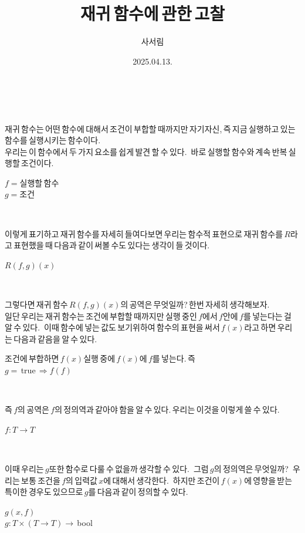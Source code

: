 \documentclass{article}
\title{재귀\,함수에\,관한\,고찰}
\author{사서림}
\date{2025.04.13.}
\begin{document}
\maketitle

\newpage
[재귀\,함수에\,관한\,고찰]
\\\\
재귀\,함수는\,어떤\,함수에\,대해서\,조건이\,부합할\,때까지만\,자기자신,\,즉\,지금\,실행하고\,있는\,함수를\,실행시키는\,함수이다.\\
우리는\,이\,함수에서\,두\,가지\,요소를\,쉽게\,발견\,할\,수\,있다.\,
바로\,실행할\,함수와\,계속\,반복\,실행할\,조건이다.
\begin{center}
$f=$실행할\,함수
\\$g=$조건
\end{center}
\,

이렇게\,표기하고\,재귀\,함수를\,자세히\,들여다보면\,우리는\,함수적\,표현으로\,재귀\,함수를\,$R$라고\,표현했을\,때\,다음과\,같이\,써볼\,수도\,있다는\,생각이\,들\,것이다.
\begin{center}
$R(f,g)(x)$
\end{center}
\,

그렇다면\,재귀\,함수\,$R(f,g)(x)$의\,공역은\,무엇일까?\,한번\,자세히\,생각해보자.\\
일단\,우리는\,재귀\,함수는\,조건에\,부합할\,때까지만\,실행\,중인\,$f$에서\,$f$안에\,$f$를\,넣는다는\,걸\,알\,수\,있다.\,
이때\,함수에\,넣는\,값도\,보기위하여\,함수의\,표현을\,써서\,$f(x)$라고\,하면\,우리는\,다음과\,같음을\,알\,수\,있다.
\begin{center}
조건에\,부합하면\,$f(x)$실행\,중에\,$f(x)$에\,$f$를\,넣는다.\,즉\\
$g=$\,true\,$\Rightarrow f(f)$
\end{center}
\,

즉\,$f$의\,공역은\,$f$의\,정의역과\,같아야\,함을\,알\,수\,있다.\,우리는\,이것을\,이렇게\,쓸\,수\,있다.
\begin{center}
$f:T \rightarrow T$
\end{center}
\,

이때\,우리는\,$g$또한\,함수로\,다룰\,수\,없을까\,생각할\,수\,있다.\,
그럼\,$g$의\,정의역은\,무엇일까?\,
우리는\,보통\,조건을\,$f$의\,입력값\,$x$에\,대해서\,생각한다.\,
하지만\,조건이\,$f(x)$에\,영향을\,받는\,특이한\,경우도\,있으므로\,$g$를\,다음과\,같이\,정의할\,수\,있다.
\begin{center}
$g(x,f)$\\
$g:T \times (T \rightarrow T) \rightarrow$\,bool
\end{center}
\,
\end{document}
